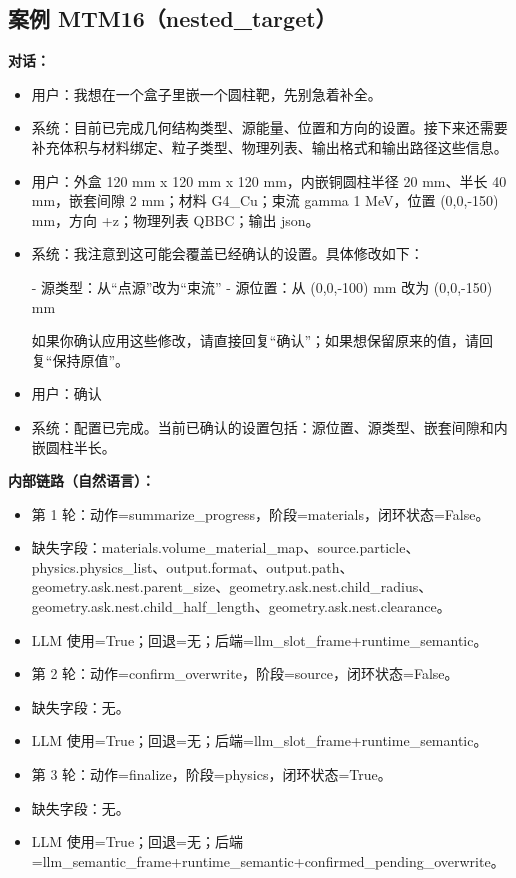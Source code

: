 \documentclass[11pt]{ctexart}
\begin{document}
\subsection{案例 MTM16（nested\_target）}
\textbf{对话：}
\begin{itemize}
\item 用户：我想在一个盒子里嵌一个圆柱靶，先别急着补全。
\item 系统：目前已完成几何结构类型、源能量、位置和方向的设置。接下来还需要补充体积与材料绑定、粒子类型、物理列表、输出格式和输出路径这些信息。
\item 用户：外盒 120 mm x 120 mm x 120 mm，内嵌铜圆柱半径 20 mm、半长 40 mm，嵌套间隙 2 mm；材料 G4\_Cu；束流 gamma 1 MeV，位置 (0,0,-150) mm，方向 +z；物理列表 QBBC；输出 json。
\item 系统：我注意到这可能会覆盖已经确认的设置。具体修改如下：

- 源类型：从“点源”改为“束流”
- 源位置：从 (0,0,-100) mm 改为 (0,0,-150) mm

如果你确认应用这些修改，请直接回复“确认”；如果想保留原来的值，请回复“保持原值”。
\item 用户：确认
\item 系统：配置已完成。当前已确认的设置包括：源位置、源类型、嵌套间隙和内嵌圆柱半长。
\end{itemize}
\textbf{内部链路（自然语言）：}
\begin{itemize}
\item 第 1 轮：动作=summarize\_progress，阶段=materials，闭环状态=False。
\item 缺失字段：materials.volume\_material\_map、source.particle、physics.physics\_list、output.format、output.path、geometry.ask.nest.parent\_size、geometry.ask.nest.child\_radius、geometry.ask.nest.child\_half\_length、geometry.ask.nest.clearance。
\item LLM 使用=True；回退=无；后端=llm\_slot\_frame+runtime\_semantic。
\item 第 2 轮：动作=confirm\_overwrite，阶段=source，闭环状态=False。
\item 缺失字段：无。
\item LLM 使用=True；回退=无；后端=llm\_slot\_frame+runtime\_semantic。
\item 第 3 轮：动作=finalize，阶段=physics，闭环状态=True。
\item 缺失字段：无。
\item LLM 使用=True；回退=无；后端=llm\_semantic\_frame+runtime\_semantic+confirmed\_pending\_overwrite。
\end{itemize}
\end{document}
